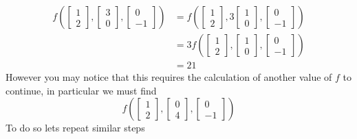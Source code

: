 \documentclass{report}
\begin{document}
$$
\begin{aligned}
f\left(\begin{bmatrix} 1 \\ 2 \end{bmatrix}, \begin{bmatrix} 3 \\ 0 \end{bmatrix}, \begin{bmatrix} 0 \\ -1 \end{bmatrix} \right) & =
f\left(\begin{bmatrix} 1 \\ 2 \end{bmatrix}, 3\begin{bmatrix} 1 \\ 0 \end{bmatrix}, \begin{bmatrix} 0 \\ -1 \end{bmatrix} \right) \\
& = 3f\left(\begin{bmatrix} 1 \\ 2 \end{bmatrix}, \begin{bmatrix} 1 \\ 0 \end{bmatrix}, \begin{bmatrix} 0 \\ -1 \end{bmatrix} \right) \\
& = 21
\end{aligned}
$$
However you may notice that this requires the calculation of another value of $f$ to continue, in particular we must find
$$
f\left(\begin{bmatrix} 1 \\ 2 \end{bmatrix}, \begin{bmatrix} 0 \\ 4 \end{bmatrix}, \begin{bmatrix} 0 \\ -1 \end{bmatrix} \right)
$$
To do so lets repeat similar steps
\end{document}
